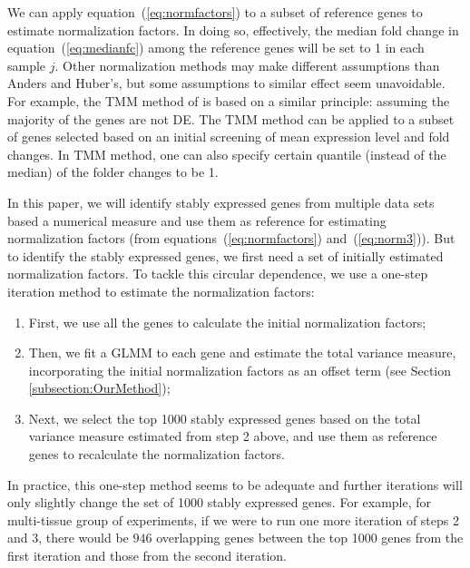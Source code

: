 \documentclass[letterpaper,12pt]{article}
\begin{document}

We can apply equation~(\ref{eq:normfactors}) to a subset of reference genes to
estimate normalization factors.  In doing so,  effectively, the median fold
change in equation~(\ref{eq:medianfc}) among the reference genes will be set
to 1 in each sample $j$.
Other normalization methods may make different assumptions
than Anders and Huber's, but some assumptions to similar effect seem
unavoidable.  For example, the TMM method of \citet{robinson2010scaling} is
based on a similar principle: assuming the majority of the genes are not DE.
The TMM method can be applied to a subset of genes selected based on an
initial screening of mean expression level and fold changes. In TMM method,
one can also specify certain quantile (instead of the median) of the folder
changes to be 1.

In this paper, we will identify stably expressed genes from multiple data sets
based a numerical measure and use them as reference for estimating
normalization factors (from equations~(\ref{eq:normfactors}) and~(\ref{eq:norm3})). 
But to identify the stably expressed genes, we first
need a set
of initially estimated normalization factors.  To tackle this circular
dependence, we use a one-step iteration method to estimate the normalization
factors: 
\begin{enumerate}
    \item
	First, we use all the genes to calculate the initial normalization factors; 
    \item
	Then, we fit a GLMM to each gene and estimate the total variance measure, incorporating the initial normalization factors as
	an offset term (see Section \ref{subsection:OurMethod}); 
    \item
	Next, we select the top 1000 stably expressed genes based on the total
	variance measure estimated from step 2 above, and use them as
	reference genes to recalculate the normalization factors. 
\end{enumerate}
In practice, this one-step method seems to be adequate and further iterations
will only slightly change the set of 1000 stably expressed genes.  For
example, for multi-tissue group of experiments, if we were to run one more
iteration of steps 2 and 3, there would be $946$ overlapping genes between
the top 1000 genes from the first iteration and those from the second
iteration.
\end{document}
